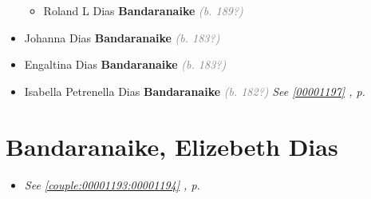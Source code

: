\documentclass[10pt, openany]{book}
\begin{document}
\begin{itemize}
{\begin{itemize}
{\begin{itemize}
{\begin{itemize}
{\begin{itemize}
{\begin{itemize}
{\begin{itemize}
\item{Edward \textbf{Perera} \textcolor{gray}{\textit{(b. 195?)}}
 }
\item{Nihal \textbf{Perera} \textcolor{gray}{\textit{(b. 195?)}}
 }
\item{Chrishantha \textbf{Perera} \textcolor{gray}{\textit{(b. 195?)}}
 }
\end{itemize}}
\end{itemize}
   }
\end{itemize}}
\end{itemize}
   }
\item{Roland L Dias \textbf{Bandaranaike} \textcolor{gray}{\textit{(b. 189?)}}
   }
\end{itemize}}
\end{itemize}
  }
\item{Johanna Dias \textbf{Bandaranaike} \textcolor{gray}{\textit{(b. 183?)}}
  }
\item{Engaltina Dias \textbf{Bandaranaike} \textcolor{gray}{\textit{(b. 183?)}}
  }
\item{Isabella Petrenella Dias \textbf{Bandaranaike} \textcolor{gray}{\textit{(b. 182?)}} \textcolor{slteal}{\textit{See  \autoref{00001197} \textit{, p. \pageref{00001197} }}}}
\end{itemize}
    
\chapter{Bandaranaike, Elizebeth Dias}
\label{00001194}
\textcolor{slmaroon}{\textit{}}
\begin{itemize}
\item{\textcolor{slteal}{\textit{See  \autoref{couple:00001193:00001194} \textit{, p. \pageref{couple:00001193:00001194} }}}}
\end{itemize}
  
\end{document}

